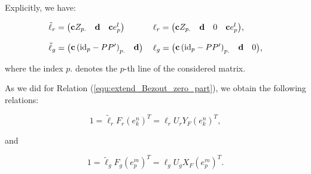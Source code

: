 \documentclass{ifacconf}
\newcommand\g[1]{\textbf{#1}}
\newcommand\id[1]{\text{id}_{#1}}
\begin{document}
Explicitly, we have:
\begin{small}
  \[\begin{tabular}{l l}
  $\tilde{\ell}_r=\begin{pmatrix}
  \g{c}Z_{p.} & \g{d} & \g{c}e^{l}_p
  \end{pmatrix}$
  &
  $\ell_r=\begin{pmatrix}
  \g{c}Z_{p.} & \g{d} & 0 & \g{c}e^{l}_p
  \end{pmatrix}$,\\
  & \\
  $\tilde{\ell}_g=\begin{pmatrix}
  \g{c}\left(\id{p}-PP'\right)_{p.} & \g{d}
  \end{pmatrix}$ &
  $\ell_g=\begin{pmatrix}
  \g{c}\left(\id{p}-PP'\right)_{p.} & \g{d} & 0
  \end{pmatrix}$,
  \end{tabular}\]
\end{small}
\smallskip
where the index $p.$ denotes the $p$-th line of the considered matrix.

As we did for Relation (\ref{equ:extend_Bezout_zero_part}), we obtain the
following relations:
\begin{small}
  \begin{equation}\label{equ:extend_Bezout_id_rel_part}
    1=\tilde{\ell}_rF_r(e^n_{k})^T=\ell_rU_rY_F(e^n_{k})^T,
  \end{equation}
\end{small}
and
\begin{small}
  \begin{equation}\label{equ:extend_Bezout_id_gen_part}
    1=\tilde{\ell}_gF_g(e^m_p)^T=\ell_gU_gX_F(e^m_p)^T.
  \end{equation}
\end{small}
\end{document}
